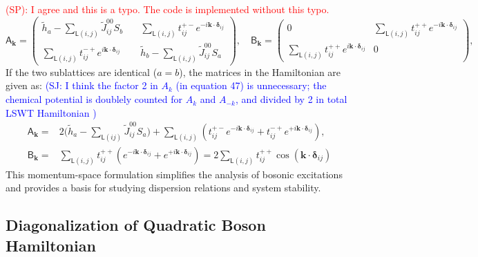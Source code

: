 \documentclass[aps, prx, nofootinbib, superscriptaddress]{revtex4-2}
\begin{document}
\textcolor{red}{ (SP): 
    I agree and this is a typo. The code is implemented without this typo.
}
\begin{equation}
    \mathsf{A}_{\mathbf{k}} = 
    \begin{pmatrix}
        \widetilde{h}_{a} - \sum_{\mathsf{L}(i,j)} \widetilde{J}_{ij}^{00} S_{b} \quad
        & \sum_{\mathsf{L}(i,j)}t^{+-}_{ij} e^{-i \mathbf{k} \cdot \bm{\delta}_{ij}} \\[0.5em]
        \sum_{\mathsf{L}(i,j)}t^{-+}_{ij} e^{i \mathbf{k} \cdot \bm{\delta}_{ij}} \quad &
        \widetilde{h}_{b} - \sum_{\mathsf{L}(i,j)} \widetilde{J}_{ij}^{00} S_{a}
    \end{pmatrix},
    \quad  \mathsf{B}_{\mathbf{k}} =
    \begin{pmatrix}
        0   & \sum_{\mathsf{L}(i,j)}t^{++}_{ij} e^{-i \mathbf{k} \cdot \bm{\delta}_{ij}} \\[0.5em]
        \sum_{\mathsf{L}(i,j)}t^{++}_{ij} e^{i \mathbf{k} \cdot \bm{\delta}_{ij}} &    0
    \end{pmatrix},
\end{equation}
If the two sublattices are identical ($a = b$), the matrices in the Hamiltonian are given as: \textcolor{blue}{(SJ: I think the factor 2 in $A_k$ (in equation 47) is unnecessary; the chemical potential is doublely counted for $A_k$ and $A_{-k}$, and divided by 2 in total LSWT Hamiltonian )}
\begin{equation}
    \begin{split}
        \mathsf{A}_{\mathbf{k}} 
        = & 2 \Big( \widetilde{h}_{a} - \sum_{\mathsf{L}(ij)} \widetilde{J}_{ij}^{00} S_{a} \Big)
        + \sum_{\mathsf{L}(i,j)}(t_{ij}^{+-} e^{-i \mathbf{k} \cdot \bm{\delta}_{ij}} + t^{-+}_{ij} e^{+i \mathbf{k} \cdot \bm{\delta}_{ij}}), \\
        \mathsf{B}_{\mathbf{k}} 
        = & \sum_{\mathsf{L}(i,j)}t^{++}_{ij} (e^{-i \mathbf{k} \cdot \bm{\delta}_{ij}} + e^{+i \mathbf{k} \cdot \bm{\delta}_{ij}})
        = 2 \sum_{\mathsf{L}(i,j)}t^{++}_{ij} \cos ( \mathbf{k} \cdot \bm{\delta}_{ij}) 
    \end{split}
\end{equation}
This momentum-space formulation simplifies the analysis of bosonic excitations and provides a basis for studying dispersion relations and system stability.



\subsection{Diagonalization of Quadratic Boson Hamiltonian}
\end{document}
